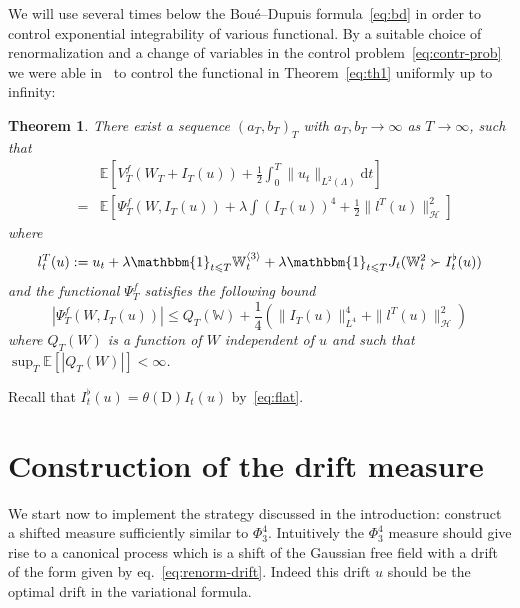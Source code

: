 \documentclass[11pt]{article}
\newcommand{\assign}{:=}
\newcommand{\mathD}{\mathrm{D}}
\newcommand{\mathd}{\mathrm{d}}
\newtheorem{theorem}{Theorem}
\begin{document}
We will use several times below the Bou{\'e}--Dupuis formula~{\eqref{eq:bd}}
in order to control exponential integrability of various functional. By a
suitable choice of renormalization and a change of variables in the control
problem~{\eqref{eq:contr-prob}} we were able
in~{\cite{barashkov_gubinelli_variational}} to control the functional in
Theorem~\ref{eq:th1} uniformly up to infinity:

\begin{theorem}
  \label{thm:equicoerc}There exist a sequence $(a_T, b_T)_T$ with $a_T, b_T
  \rightarrow \infty$ as $T \rightarrow \infty$, such that
  \begin{eqnarray*}
    &  & \mathbb{E} \left[ V^f_T (W_T + I_T (u)) + \frac{1}{2} \int^T_0 \|
    u_t \|_{L^2 (\Lambda)} \mathd t \right]\\
    & = & \mathbb{E} \left[ \Psi^f_T (W, I_T (u)) + \lambda \int (I_T (u))^4
    + \frac{1}{2} \| l^T (u) \|_{\mathcal{H}}^2 \right]
  \end{eqnarray*}
  where
  \begin{equation}
    l_t^T (u) \assign u_t + \lambda \mathbbm{1}_{t \leqslant T}
    \mathbb{W}^{\langle 3 \rangle}_t + \lambda \mathbbm{1}_{t \leqslant T} J_t
    (\mathbb{W}_t^2 \succ I_t^{\flat} (u)) \label{eq:renorm-drift}
  \end{equation}
  and the functional $\Psi^f_T$ satisfies the following bound
  \[ | \Psi^f_T (W, I_T (u)) | \leqslant Q_T (\mathbb{W}) + \frac{1}{4} (\|
     I_T (u) \|^4_{L^4} + \| l^T (u) \|_{\mathcal{H}}^2) \]
  where $Q_T (W)$ is a function of $W$ independent of $u$ and such that
  $\sup_T \mathbb{E} [| Q_T (W) |] < \infty$.
\end{theorem}

Recall that $I_t^{\flat} (u) = \theta (\mathD) I_t (u)$ by~{\eqref{eq:flat}}.

\section{Construction of the drift measure}

We start now to implement the strategy discussed in the introduction:
construct a shifted measure sufficiently similar to $\Phi^4_3$. Intuitively
the $\Phi^4_3$ measure should give rise to a canonical process which is a
shift of the Gaussian free field with a drift of the form given by
eq.~{\eqref{eq:renorm-drift}}. Indeed this drift $u$ should be the optimal
drift in the variational formula.

\
\end{document}
